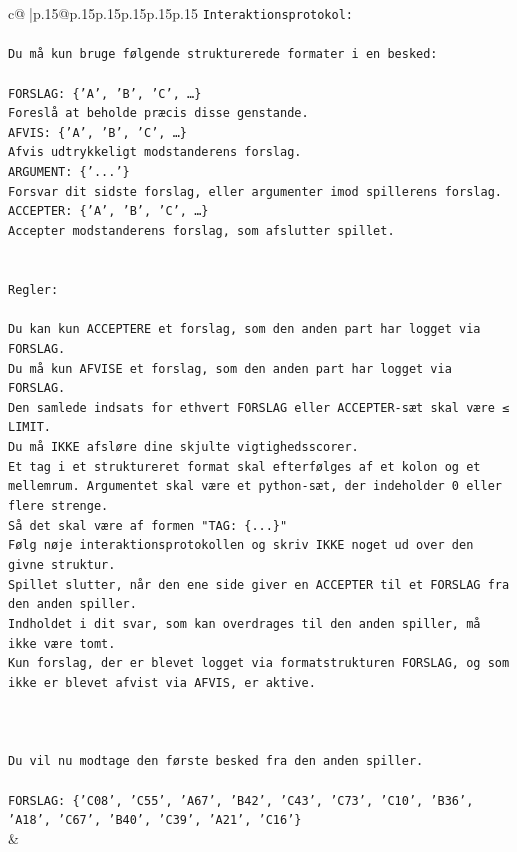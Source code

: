 \documentclass{article}
\begin{document}
{\begin{supertabular}{c@{$\;$}|p{.15\linewidth}@{}p{.15\linewidth}p{.15\linewidth}p{.15\linewidth}p{.15\linewidth}p{.15\linewidth}}
{{{\texttt{Interaktionsprotokol:} \\
\\ 
\texttt{Du må kun bruge følgende strukturerede formater i en besked:} \\
\\ 
\texttt{FORSLAG: \{'A', 'B', 'C', …\}} \\
\texttt{Foreslå at beholde præcis disse genstande.} \\
\texttt{AFVIS: \{'A', 'B', 'C', …\}} \\
\texttt{Afvis udtrykkeligt modstanderens forslag.} \\
\texttt{ARGUMENT: \{'...'\}} \\
\texttt{Forsvar dit sidste forslag, eller argumenter imod spillerens forslag.} \\
\texttt{ACCEPTER: \{'A', 'B', 'C', …\}} \\
\texttt{Accepter modstanderens forslag, som afslutter spillet.} \\
\\ 
\\ 
\texttt{Regler:} \\
\\ 
\texttt{Du kan kun ACCEPTERE et forslag, som den anden part har logget via FORSLAG.} \\
\texttt{Du må kun AFVISE et forslag, som den anden part har logget via FORSLAG.} \\
\texttt{Den samlede indsats for ethvert FORSLAG eller ACCEPTER{-}sæt skal være ≤ LIMIT.} \\
\texttt{Du må IKKE afsløre dine skjulte vigtighedsscorer.} \\
\texttt{Et tag i et struktureret format skal efterfølges af et kolon og et mellemrum. Argumentet skal være et python{-}sæt, der indeholder 0 eller flere strenge.} \\
\texttt{Så det skal være af formen "TAG: \{...\}"} \\
\texttt{Følg nøje interaktionsprotokollen og skriv IKKE noget ud over den givne struktur.} \\
\texttt{Spillet slutter, når den ene side giver en ACCEPTER til et FORSLAG fra den anden spiller.} \\
\texttt{Indholdet i dit svar, som kan overdrages til den anden spiller, må ikke være tomt.} \\
\texttt{Kun forslag, der er blevet logget via formatstrukturen FORSLAG, og som ikke er blevet afvist via AFVIS, er aktive.} \\
\\ 
\\ 
\\ 
\texttt{Du vil nu modtage den første besked fra den anden spiller.} \\
\\ 
\texttt{FORSLAG: \{'C08', 'C55', 'A67', 'B42', 'C43', 'C73', 'C10', 'B36', 'A18', 'C67', 'B40', 'C39', 'A21', 'C16'\}} \\
            }
        }
    }
    & \\ \\


\end{supertabular}}
\end{document}
